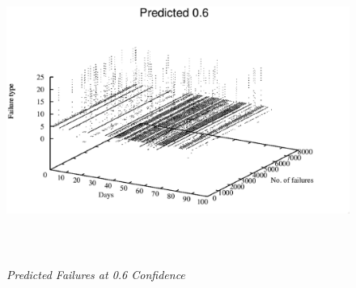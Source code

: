 \newpage

\begin{figure}[h]
		\begin{center}
			\includegraphics[width=15cm,height=10cm]{figures/predicted0.6.eps} 
			\caption{\small \sl Predicted Failures at 0.6 Confidence\label{fig:Label7}} 
		\end{center} 
	\end{figure}



